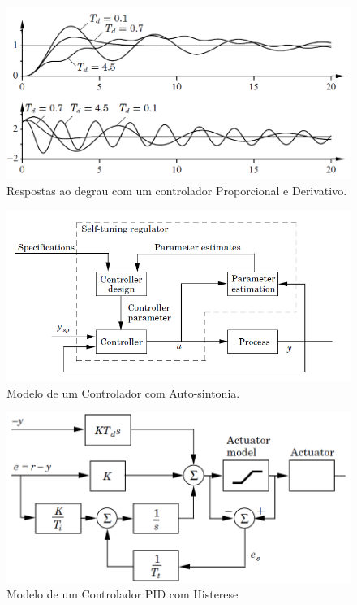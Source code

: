 \begin{figure}[htb]
  \caption{Respostas ao degrau com um controlador Proporcional e Derivativo.}
  \begin{center}
      \includegraphics[scale=0.65]{img/pid_astrom_p70}
  \end{center}
  \label{fig:pid_astrom_p70}
\end{figure}

\begin{figure}[htb]
  \caption{Modelo de um Controlador com Auto-sintonia.}
  \begin{center}
      \includegraphics[scale=0.75]{img/pid_adaptative_astrom_p233}
  \end{center}
  \label{fig:pid_adaptative_astrom_p233}
\end{figure}

\begin{figure}[htb]
  \caption{Modelo de um Controlador PID com Histerese}
  \begin{center}
      \includegraphics[scale=0.65]{img/pid_antiwindup_astrom_p83}
  \end{center}
  \label{fig:pid_antiwindup_astrom_p83}
\end{figure}

